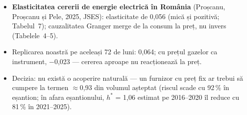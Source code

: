 \begin{itemize}\setlength{\itemsep}{2pt}
  \item \textbf{Elasticitatea cererii de energie electrică în România} (Proșcanu, Proșcanu și Pele, 2025, JSES): elasticitate de 0,056 (mică și pozitivă; Tabelul~7); cauzalitatea Granger merge de la consum la preț, nu invers (Tabelele~4--5).
  \item Replicarea noastră pe aceleași 72 de luni: 0,064; cu prețul gazelor ca instrument, $-$0,023 --- cererea aproape nu reacționează la preț.
  \item Decizia: nu există o acoperire naturală --- un furnizor cu preț fix ar trebui să cumpere la termen $\approx$0,93 din volumul așteptat (riscul scade cu 92\,\% în eșantion; în afara eșantionului, $h^*$ = 1,06 estimat pe 2016--2020 îl reduce cu 81\,\% în 2021--2025).
\end{itemize}
